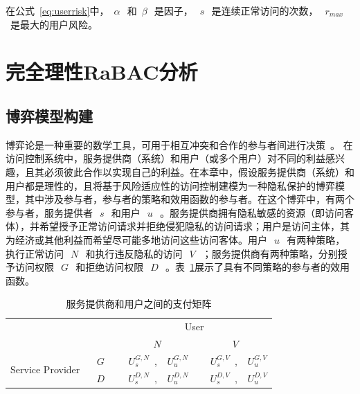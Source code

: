 在公式~\ref{eq:userrisk}中，~$\alpha~$~和~$\beta~$~是因子，~$~s~$~是连续正常访问的次数，~$~r_{max}$~是最大的用户风险。

\section{完全理性RaBAC分析}
\label{sec:gamemodel}

\subsection{博弈模型构建}

博弈论是一种重要的数学工具，可用于相互冲突和合作的参与者间进行决策~\cite{owen2001game}。
在访问控制系统中，服务提供商（系统）和用户（或多个用户）对不同的利益感兴趣，且其必须彼此合作以实现自己的利益。在本章中，假设服务提供商（系统）和用户都是理性的，且将基于风险适应性的访问控制建模为一种隐私保护的博弈模型，其中涉及参与者，参与者的策略和效用函数的参与者。在这个博弈中，有两个参与者，服务提供者~$~s~$~和用户~$~u~$~。服务提供商拥有隐私敏感的资源（即访问客体），并希望授予正常访问请求并拒绝侵犯隐私的访问请求；用户是访问主体，其为经济或其他利益而希望尽可能多地访问这些访问客体。用户~$~u~$~有两种策略，执行正常访问~$~N~$~和执行违反隐私的访问~$~V~$~；服务提供商有两种策略，分别授予访问权限~$~G~$~和拒绝访问权限~$~D~$~。表~\ref{tab:payoff}展示了具有不同策略的参与者的效用函数。

\begin{table}[htb]
	\caption{服务提供商和用户之间的支付矩阵}\label{tab:payoff}
	\centering 
	\begin{tabular}{cccc}
		\toprule
		\multicolumn{2}{c}{\multirow{2}{*}{}} & \multicolumn{2}{c}{User} \\
		\cline{3-4}
		& & ~$~N~$~ & ~$~V~$~ \\	
		\hline
		\multirow{2}{*}{Service Provider} & ~$~G~$~ &~$~U_s^{G,N}$~, ~$~U_u^{G,N}$~ & ~$~U_s^{G,V}$~, ~$~U_u^{G,V}$\\
		\cline{2-4}
		& ~$~D~$~ & ~$~U_s^{D,N}$~, ~$~U_u^{D,N}$~ & ~$~U_s^{D,V}$~, ~$~U_u^{D,V}$\\
		\toprule
	\end{tabular}
\end{table}


